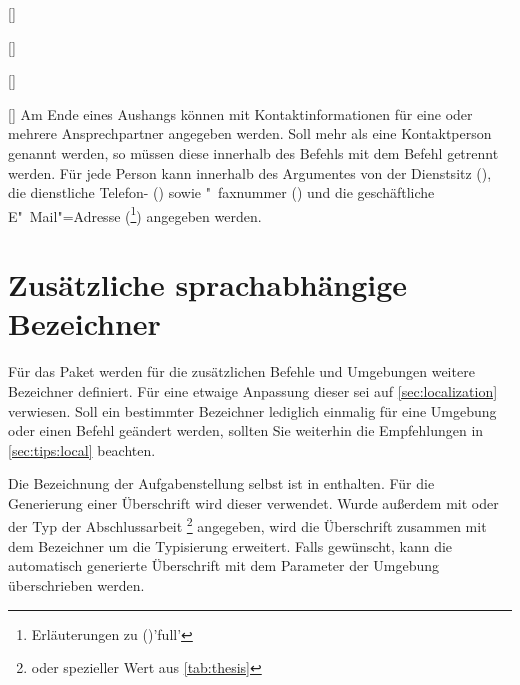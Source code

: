 \begin{Entity*}{}
\begin{Declaration}[v2.02]{[]}
\begin{Declaration}[v2.02]{[]}
\begin{Declaration}[v2.05]{[]}
\begin{Declaration}{[]}
\printdeclarationlist%
%
Am Ende eines Aushangs können mit  Kontaktinformationen 
für eine oder mehrere Ansprechpartner angegeben werden. Soll mehr als eine 
Kontaktperson genannt werden, so müssen diese innerhalb des Befehls
 mit dem Befehl  getrennt werden. Für jede 
Person kann innerhalb des Argumentes von  der Dienstsitz 
(), die dienstliche Telefon- () sowie "~faxnummer
() und die geschäftliche E"~Mail"=Adresse 
(\footnote{Erläuterungen zu ()'full'}) 
angegeben werden.
\end{Declaration}
\end{Declaration}
\end{Declaration}
\end{Declaration}



\section{%
  Zusätzliche sprachabhängige Bezeichner%
}
Für das Paket  werden für die zusätzlichen Befehle 
und Umgebungen weitere Bezeichner definiert. Für eine etwaige Anpassung dieser 
sei auf \autoref{sec:localization} verwiesen. Soll ein bestimmter Bezeichner 
lediglich einmalig für eine Umgebung oder einen Befehl geändert werden, sollten 
Sie weiterhin die Empfehlungen in \autoref{sec:tips:local} beachten.

\begin{Declaration}{}
\begin{Declaration}{}
\printdeclarationlist%
%
Die Bezeichnung der Aufgabenstellung selbst ist in  enthalten. 
Für die Generierung einer Überschrift wird dieser verwendet. Wurde außerdem mit 
 oder  der Typ der Abschlussarbeit%
\footnote{%
   oder spezieller Wert aus \autoref{tab:thesis}%
}
angegeben, wird die Überschrift zusammen mit dem Bezeichner 
um die Typisierung erweitert. Falls gewünscht, kann die automatisch generierte 
Überschrift mit dem Parameter  der Umgebung 
 überschrieben werden.
%
\end{Declaration}
\end{Declaration}


\end{Entity*}
